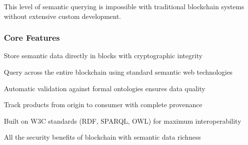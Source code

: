 \documentclass[letterpaper,10pt,english]{sphinxmanual}
\begin{document}
\begin{sphinxVerbatim}[commandchars=\\\{\}]
     
     
           
           
           

     
     
     
               
     
               
\end{sphinxVerbatim}

\sphinxAtStartPar
This level of semantic querying is impossible with traditional blockchain systems without extensive custom development.


\subsubsection{Core Features}
\label{\detokenize{foundational/intro-to-provchainorg:core-features}}\begin{description}
\sphinxAtStartPar
Store semantic data directly in blocks with cryptographic integrity

\sphinxAtStartPar
Query across the entire blockchain using standard semantic web technologies

\sphinxAtStartPar
Automatic validation against formal ontologies ensures data quality

\sphinxAtStartPar
Track products from origin to consumer with complete provenance

\sphinxAtStartPar
Built on W3C standards (RDF, SPARQL, OWL) for maximum interoperability

\sphinxAtStartPar
All the security benefits of blockchain with semantic data richness

\end{description}
\end{document}
